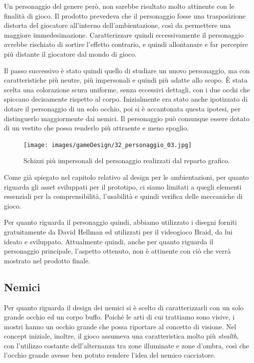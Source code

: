 Un personaggio del genere però, non sarebbe risultato molto attinente con le finalità di gioco. Il prodotto prevedeva che il personaggio fosse una trasposizione distorta del giocatore all’interno dell’ambientazione, così da permettere una maggiore immedesimazione. Caratterizzare quindi eccessivamente il personaggio avrebbe rischiato di sortire l’effetto contrario, e quindi allontanare e far percepire più distante il giocatore dal mondo di gioco.

Il passo successivo è stato quindi quello di studiare un nuovo personaggio, ma con caratteristiche più neutre, più impersonali e quindi più adatte allo scopo.
È stata scelta una colorazione scura uniforme, senza eccessivi dettagli, con i due occhi che spiccano decisamente rispetto al corpo. Inizialmente era stato anche ipotizzato di dotare il personaggio di un solo occhio, poi si è accantonata questa ipotesi, per distinguerlo maggiormente dai nemici. Il personaggio può comunque essere dotato di un vestito che possa renderlo più attraente e meno spoglio.

\begin{figure}%
	\centering
	\texttt{[image: images/gameDesign/32\_personaggio\_03.jpg]}
	\caption{Schizzi più impersonali del personaggio realizzati dal reparto grafico.}
	\label{fig:ambientazione_personaggio_02}
\end{figure}

Come già spiegato nel capitolo relativo al design per le ambientazioni, per quanto riguarda gli asset sviluppati per il prototipo, ci siamo limitati a quegli elementi essenziali per la comprensibilità, l’usabilità e quindi verifica delle meccaniche di gioco.

Per quanto riguarda il personaggio quindi, abbiamo utilizzato i disegni forniti gratuitamente da David Hellman \cite{DavidHellmanSite} ed utilizzati per il videogioco Braid, da lui ideato e sviluppato.
Attualmente quindi, anche per quanto riguarda il personaggio principale, l’aspetto ottenuto, non è attinente con ciò che verrà mostrato nel prodotto finale.

\subsection{Nemici}
\label{sec:nemici}

Per quanto riguarda il design dei nemici si è scelto di caratterizzarli con un solo grande occhio ed un corpo buffo. Poiché le arti di cui trattiamo sono visive, i mostri hanno un occhio grande che possa riportare al concetto di visione. Nel concept iniziale, inoltre, il gioco assumeva una caratteristica molto più \textit{stealth}, con l’utilizzo costante dell’alternanza tra zone illuminate e zone d’ombra, così che l’occhio grande avesse ben potuto rendere l’idea del nemico cacciatore.

